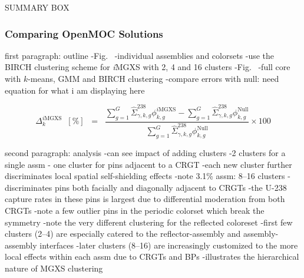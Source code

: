 \clearpage

SUMMARY BOX

\subsubsection{Comparing OpenMOC Solutions}
\label{subsec:chap11-imgxs-capt-rates-compare}

first paragraph: outline
-Fig.~
  -individual assemblies and colorsets
  -use the BIRCH clustering scheme for \textit{i}\ac{MGXS} with 2, 4 and 16 clusters
-Fig.~
  -full core with $k$-means, \ac{GMM} and BIRCH clustering
-compare errors with null: need equation for what i am displaying here

\begin{equation}
\label{eqn:chap11-compare-openmoc}
\Delta_{k}^{\mathrm{\textit{i}MGXS}} \;\; [\%] \;\; = \;\; \frac{\displaystyle\sum\limits_{g=1}^{G} \hat{\Sigma}^{238}_{\gamma,k,g}\phi_{k,g}^{\mathrm{\textit{i}MGXS}} - \displaystyle\sum\limits_{g=1}^{G} \hat{\Sigma}^{238}_{\gamma,k,g}\phi_{k,g}^{\mathrm{Null}}}{\displaystyle\sum\limits_{g=1}^{G} \hat{\Sigma}^{238}_{\gamma,k,g}\phi_{k,g}^{\mathrm{Null}}} \times 100
\end{equation}

second paragraph: analysis
-can see impact of adding clusters
-2 clusters for a single assm - one cluster for pins adjacent to a \ac{CRGT}
-each new cluster further discriminates local spatial self-shielding effects
  -note 3.1\% assm: 8--16 clusters 
    -discriminates pins both facially and diagonally adjacent to \acp{CRGT}
    -the U-238 capture rates in these pins is largest due to differential moderation from both \acp{CRGT}
-note a few outlier pins in the periodic colorset which break the symmetry
-note the very different clustering for the reflected coloreset
  -first few clusters (2--4) are especially catered to the reflector-assembly and assembly-assembly interfaces
  -later clusters (8--16) are increasingly customized to the more local effects within each assm due to \acp{CRGT} and \acp{BP}
  -illustrates the hierarchical nature of \ac{MGXS} clustering


